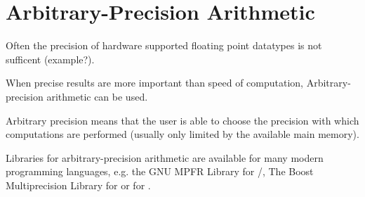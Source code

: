 \section{Arbitrary-Precision Arithmetic}
	Often the precision of hardware supported floating point datatypes is not sufficent (example?).
	
	When precise results are more important than speed of computation, Arbitrary-precision arithmetic can be used.

	Arbitrary precision means that the user is able to choose the precision with which 
	computations are performed (usually only limited by the available main memory).

	Libraries for arbitrary-precision arithmetic are available for many modern programming languages, 
	e.g. the GNU MPFR Library for /\cc, The Boost Multiprecision Library for \cc or  for . 

